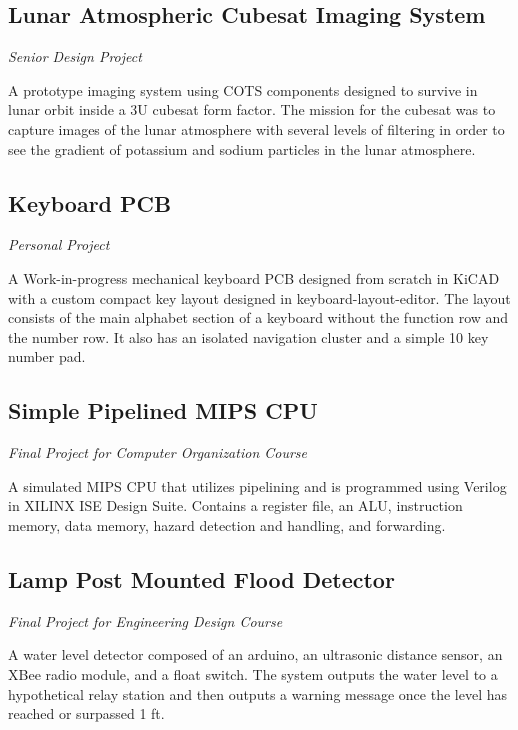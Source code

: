 \documentclass{article}
\begin{document}
\subsection{Lunar Atmospheric Cubesat Imaging System} \textit{Senior Design Project}

A prototype imaging system using COTS components designed to survive in lunar orbit inside a 3U cubesat form factor. The mission for the cubesat was to capture images of the lunar atmosphere with several levels of filtering in order to see the gradient of potassium and sodium particles in the lunar atmosphere.
\vspace{-.75em}
\subsection{Keyboard PCB} \textit{Personal Project}

A Work-in-progress mechanical keyboard PCB designed from scratch in KiCAD with a custom compact key layout designed in keyboard-layout-editor. The layout consists of the main alphabet section of a keyboard without the function row and the number row. It also has an isolated navigation cluster and a simple 10 key number pad.
\vspace{-.75em}
\subsection{Simple Pipelined MIPS CPU} \textit{Final Project for Computer Organization Course}

A simulated MIPS CPU that utilizes pipelining and is programmed using Verilog in XILINX ISE Design Suite. Contains a register file, an ALU, instruction memory, data memory, hazard detection and handling, and forwarding.
\vspace{-.75em}
\subsection{Lamp Post Mounted Flood Detector} \textit{Final Project for Engineering Design Course}

A water level detector composed of an arduino, an ultrasonic distance sensor, an XBee radio module, and a float switch. The system outputs the water level to a hypothetical relay station and then outputs a warning message once the level has reached or surpassed 1 ft.
\vspace{-.75em}
\end{document}
